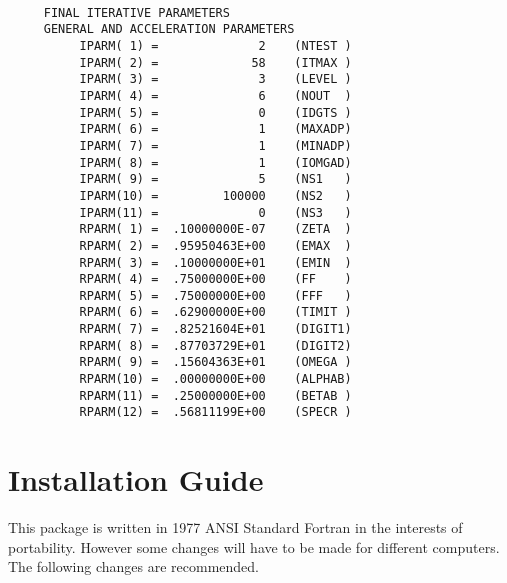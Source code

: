 \newpage
\begin{verbatim}
 
     FINAL ITERATIVE PARAMETERS
     GENERAL AND ACCELERATION PARAMETERS
          IPARM( 1) =              2    (NTEST )
          IPARM( 2) =             58    (ITMAX )
          IPARM( 3) =              3    (LEVEL )
          IPARM( 4) =              6    (NOUT  )
          IPARM( 5) =              0    (IDGTS )
          IPARM( 6) =              1    (MAXADP)
          IPARM( 7) =              1    (MINADP)
          IPARM( 8) =              1    (IOMGAD)
          IPARM( 9) =              5    (NS1   )
          IPARM(10) =         100000    (NS2   )
          IPARM(11) =              0    (NS3   )
          RPARM( 1) =  .10000000E-07    (ZETA  )
          RPARM( 2) =  .95950463E+00    (EMAX  )
          RPARM( 3) =  .10000000E+01    (EMIN  )
          RPARM( 4) =  .75000000E+00    (FF    )
          RPARM( 5) =  .75000000E+00    (FFF   )
          RPARM( 6) =  .62900000E+00    (TIMIT )
          RPARM( 7) =  .82521604E+01    (DIGIT1)
          RPARM( 8) =  .87703729E+01    (DIGIT2)
          RPARM( 9) =  .15604363E+01    (OMEGA )
          RPARM(10) =  .00000000E+00    (ALPHAB)
          RPARM(11) =  .25000000E+00    (BETAB )
          RPARM(12) =  .56811199E+00    (SPECR )
\end{verbatim}
 
\newpage
\section{Installation Guide}
\label{install}
\indent
 
   This package is written in 1977 ANSI Standard Fortran in the
interests of portability.  However some changes will have to be
made for different computers.  The following changes are
recommended.
 
